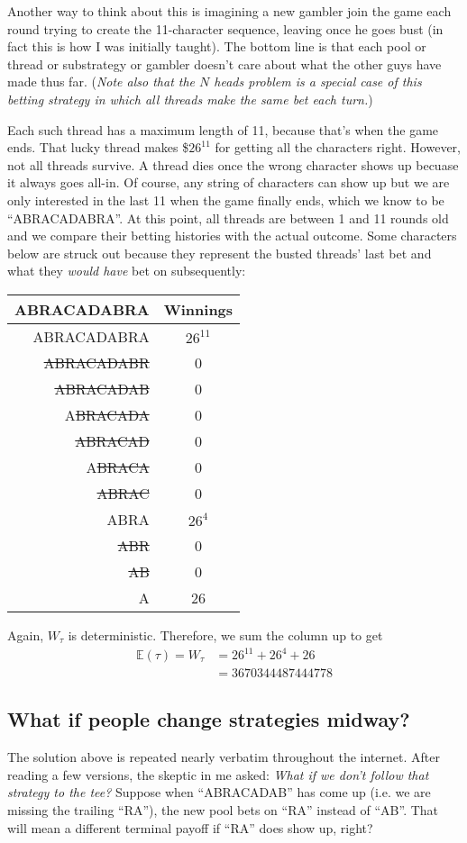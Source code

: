 \documentclass[11pt]{article}
\newcommand{\E}{\mathbb{E}}
\begin{document}
Another way to think about this is imagining a new gambler join the game each round trying to create the 11-character sequence, leaving once he goes bust (in fact this is how I was initially taught). The bottom line is that each pool or thread or substrategy or gambler doesn't care about what the other guys have made thus far. 
(\textit{Note also that the $N$ heads problem is a special case of this betting strategy in which all threads make the same bet each turn.})

Each such thread has a maximum length of 11, because that's when the game ends. That lucky thread makes \$$26^{11}$ for getting all the characters right. However, not all threads survive. A thread dies once the wrong character shows up becuase it always goes all-in. Of course, any string of characters can show up but we are only interested in the last 11 when the game finally ends, which we know to be ``ABRACADABRA''. At this point, all threads are between 1 and 11 rounds old and we compare their betting histories with the actual outcome. Some characters below are struck out because they represent the busted threads' last bet and what they \emph{would have} bet on subsequently:
\begin{center}
  \begin{tabular}{ |r|c| } 
   \hline
   ABRACADABRA & Winnings \\ \hline 
   ABRACADABRA & $26^{11}$\\ 
   \sout{ABRACADABR} & 0 \\ 
   \sout{ABRACADAB} & 0 \\ 
   A\sout{BRACADA} & 0 \\
   \sout{ABRACAD} & 0 \\
   A\sout{BRACA} & 0\\
   \sout{ABRAC} & 0 \\
   ABRA & $26^4$ \\
   \sout{ABR} & 0 \\
   \sout{AB} & 0 \\
   A & 26 \\ \hline
  \end{tabular}
\end{center}
Again, $W_\tau$ is deterministic. Therefore, we sum the column up to get 
\begin{align*}
\E(\tau) = W_\tau &= 26^{11} + 26^4 + 26 \\
&= \boxed{3670344487444778}
\end{align*}

\subsection{What if people change strategies midway?}
The solution above is repeated nearly verbatim throughout the internet. After reading a few versions, the skeptic in me asked: \emph{What if we don't follow that strategy to the tee?} Suppose when ``ABRACADAB'' has come up (i.e. we are missing the trailing ``RA''), the new pool bets on ``RA'' instead of ``AB''. That will mean a different terminal payoff if ``RA'' does show up, right?
\end{document}
